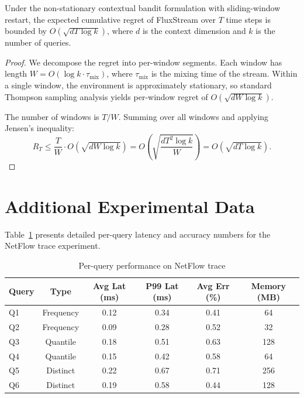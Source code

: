 \documentclass[
    language=english,
    doctype=dissertation,
    institution=none,
    titlestyle=book,
]{../../omnilatex}
\begin{document}
\begin{theorem}
Under the non-stationary contextual bandit formulation with sliding-window restart, the expected cumulative regret of FluxStream over $T$ time steps is bounded by $O(\sqrt{dT \log k})$, where $d$ is the context dimension and $k$ is the number of queries.
\end{theorem}

\begin{proof}
We decompose the regret into per-window segments. Each window has length $W = O(\log k \cdot \tau_{\text{mix}})$, where $\tau_{\text{mix}}$ is the mixing time of the stream. Within a single window, the environment is approximately stationary, so standard Thompson sampling analysis yields per-window regret of $O(\sqrt{dW \log k})$.

The number of windows is $T/W$. Summing over all windows and applying Jensen's inequality:
\[
R_T \leq \frac{T}{W} \cdot O(\sqrt{dW \log k}) = O\!\left(\sqrt{\frac{dT^2 \log k}{W}}\right) = O(\sqrt{dT \log k}).
\]
\end{proof}

\section{Additional Experimental Data}

Table~\ref{tab:detailed} presents detailed per-query latency and accuracy numbers for the NetFlow trace experiment.

\begin{table}[htbp]
\centering
\caption{Per-query performance on NetFlow trace}\label{tab:detailed}
\begin{tabular}{lccccc}
\toprule
\textbf{Query} & \textbf{Type} & \textbf{Avg Lat (ms)} & \textbf{P99 Lat (ms)} & \textbf{Avg Err (\%)} & \textbf{Memory (MB)} \\
\midrule
Q1 & Frequency & 0.12 & 0.34 & 0.41 & 64 \\
Q2 & Frequency & 0.09 & 0.28 & 0.52 & 32 \\
Q3 & Quantile  & 0.18 & 0.51 & 0.63 & 128 \\
Q4 & Quantile  & 0.15 & 0.42 & 0.58 & 64 \\
Q5 & Distinct  & 0.22 & 0.67 & 0.71 & 256 \\
Q6 & Distinct  & 0.19 & 0.58 & 0.44 & 128 \\
\bottomrule
\end{tabular}
\end{table}

\printbibliography
\end{document}
